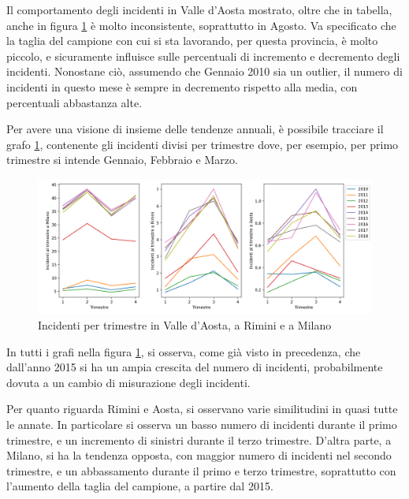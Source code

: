 \documentclass[a4paper,12pt]{report}
\begin{document}
Il comportamento degli incidenti in Valle d'Aosta mostrato, oltre che in tabella, 
anche in figura \ref{fig:aosta-rimini-milano-trimestre} è molto inconsistente, 
soprattutto in Agosto.
Va specificato che la taglia del campione con cui si sta lavorando, per questa provincia, 
è molto piccolo, e sicuramente influisce sulle percentuali di incremento e decremento 
degli incidenti.
Nonostane ciò, assumendo che Gennaio 2010 sia un outlier, il numero di incidenti in 
questo mese è sempre in decremento rispetto alla media, con percentuali abbastanza alte.

Per avere una visione di insieme delle tendenze annuali, è possibile tracciare 
il grafo \ref{fig:aosta-rimini-milano-trimestre}, contenente gli incidenti divisi 
per trimestre dove, per esempio, per primo trimestre si 
intende Gennaio, Febbraio e Marzo.

\begin{figure}
    \includegraphics[width=\linewidth]{../src/incidenti/incidenti_senza_coords/mese_incidenti/trimestri_aosta_milano_rimini.png}
    \caption{Incidenti per trimestre in Valle d'Aosta, a Rimini e a Milano}
    \label{fig:aosta-rimini-milano-trimestre}
\end{figure}

In tutti i grafi nella figura \ref{fig:aosta-rimini-milano-trimestre}, 
si osserva, come già visto in precedenza, che dall'anno 2015 si ha un ampia crescita  
del numero di incidenti, probabilmente dovuta a un cambio di misurazione 
degli incidenti. 

Per quanto riguarda Rimini e Aosta, si osservano varie similitudini in quasi 
tutte le annate. In particolare si osserva un basso numero di incidenti 
durante il primo trimestre, e un incremento di sinistri durante il terzo trimestre.
D'altra parte, a Milano, si ha la tendenza opposta, con maggior numero di 
incidenti nel secondo trimestre, e un abbassamento durante il primo 
e terzo trimestre, soprattutto con l'aumento della taglia del campione, 
a partire dal 2015.
\end{document}
